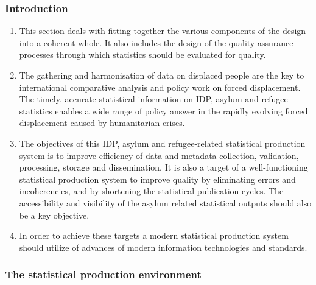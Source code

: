 \documentclass[
]{article}
\begin{document}
\hypertarget{introduction}{%
\subsubsection{Introduction}\label{introduction}}

\begin{enumerate}
\def\labelenumi{\arabic{enumi}.}
\setcounter{enumi}{267}
\item
  This section deals with fitting together the various components of
  the design into a coherent whole. It also includes the design of the
  quality assurance processes through which statistics should be
  evaluated for quality.
\item
  The gathering and harmonisation of data on displaced people are the
  key to international comparative analysis and policy work on forced
  displacement. The timely, accurate statistical information on IDP,
  asylum and refugee statistics enables a wide range of policy answer
  in the rapidly evolving forced displacement caused by humanitarian
  crises.
\item
  The objectives of this IDP, asylum and refugee-related statistical
  production system is to improve efficiency of data and metadata
  collection, validation, processing, storage and dissemination. It is
  also a target of a well-functioning statistical production system to
  improve quality by eliminating errors and incoherencies, and by
  shortening the statistical publication cycles. The accessibility and
  visibility of the asylum related statistical outputs should also be
  a key objective.
\item
  In order to achieve these targets a modern statistical production
  system should utilize of advances of modern information technologies
  and standards.
\end{enumerate}

\hypertarget{the-statistical-production-environment}{%
\subsubsection{The statistical production environment}\label{the-statistical-production-environment}}
\end{document}
